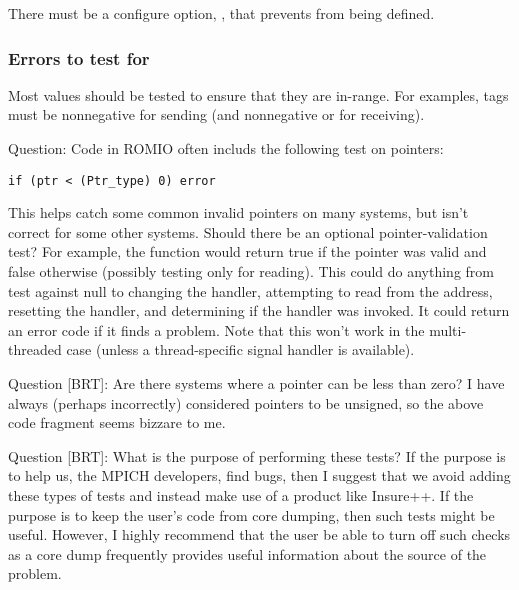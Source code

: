 \documentclass{article}
\begin{document}
There must be a configure option,
,  
that prevents  from being defined.

\subsubsection{Errors to test for}
Most values should be tested to ensure that they are in-range.  For examples,
tags must be nonnegative for sending (and nonnegative or
 for receiving). 

Question: Code in ROMIO often includs the following test on pointers:
\begin{verbatim}
if (ptr < (Ptr_type) 0) error
\end{verbatim}
This helps catch some common invalid pointers on many systems, but isn't
correct for some other systems.  Should there be an optional
pointer-validation test?  For example, the function
 would return true if the pointer was valid and
false otherwise (possibly testing only for reading).  This could do anything
from test against null to changing the  handler, attempting to
read from the address, resetting the handler, and determining if the handler
was invoked.  It could return an error code if it finds a problem.
Note that this won't work in the multi-threaded case (unless a
thread-specific signal handler is available).

Question [BRT]: Are there systems where a pointer can be less
than zero?  I have always (perhaps incorrectly) considered pointers to
be unsigned, so the above code fragment seems bizzare to me.  

Question [BRT]: What is the purpose of performing these tests?  If the
purpose is to help us, the MPICH developers, find bugs, then I suggest
that we avoid adding these types of tests and instead make use of a
product like Insure++.  If the purpose is to keep the user's code from
core dumping, then such tests might be useful.  However, I highly
recommend that the user be able to turn off such checks as a core dump
frequently provides useful information about the source of the
problem.
\end{document}
